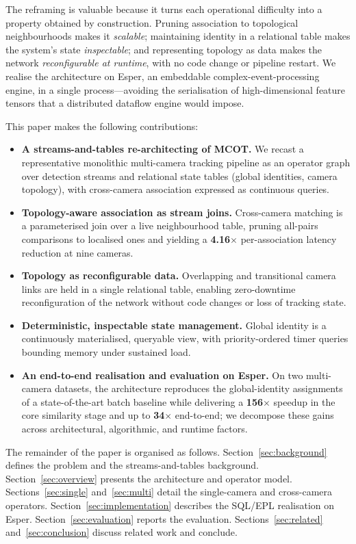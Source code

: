 \documentclass[review]{elsarticle}
\begin{document}
The reframing is valuable because it turns each operational difficulty into a property obtained by
construction. Pruning association to topological neighbourhoods makes it \emph{scalable}; main\-tain\-ing
identity in a relational table makes the system's state \emph{inspectable}; and representing topology
as data makes the network \emph{reconfigurable at runtime}, with no code change or pipeline restart.
We realise the architecture on Esper, an embeddable complex-event-processing engine, in a single
process---avoiding the serialisation of high-dimensional feature tensors that a distributed
dataflow engine would impose.

This paper makes the following contributions:
\begin{itemize}[leftmargin=*]
    \item \textbf{A streams-and-tables re-architecting of MCOT.} We recast a representative
    monolithic multi-camera tracking pipeline as an operator graph over detection streams and
    relational state tables (global identities, camera topology), with cross-camera association
    expressed as continuous queries.
    \item \textbf{Topology-aware association as stream joins.} Cross-camera matching is a
    parameterised join over a live neighbourhood table, pruning all-pairs comparisons to localised
    ones and yielding a \textbf{4.16$\times$} per-association latency reduction at nine cameras.
    \item \textbf{Topology as reconfigurable data.} Overlapping and transitional camera links are
    held in a single relational table, enabling zero-downtime reconfiguration of the network
    without code changes or loss of tracking state.
    \item \textbf{Deterministic, inspectable state management.} Global identity is a continuously
    materialised, queryable view, with priority-ordered timer queries bounding memory under
    sustained load.
    \item \textbf{An end-to-end realisation and evaluation on Esper.} On two multi-camera datasets,
    the architecture reproduces the global-identity assignments of a state-of-the-art batch
    baseline while delivering a \textbf{156$\times$} speedup in the core similarity stage and up to
    \textbf{34$\times$} end-to-end; we decompose these gains across architectural, algorithmic, and
    runtime factors.
\end{itemize}

The remainder of the paper is organised as follows. Section~\ref{sec:background} defines the
problem and the streams-and-tables background. Section~\ref{sec:overview} presents the
architecture and operator model. Sections~\ref{sec:single} and~\ref{sec:multi} detail the
single-camera and cross-camera operators. Section~\ref{sec:implementation} describes the SQL/EPL
realisation on Esper. Section~\ref{sec:evaluation} reports the evaluation.
Sections~\ref{sec:related} and~\ref{sec:conclusion} discuss related work and conclude.
\end{document}
